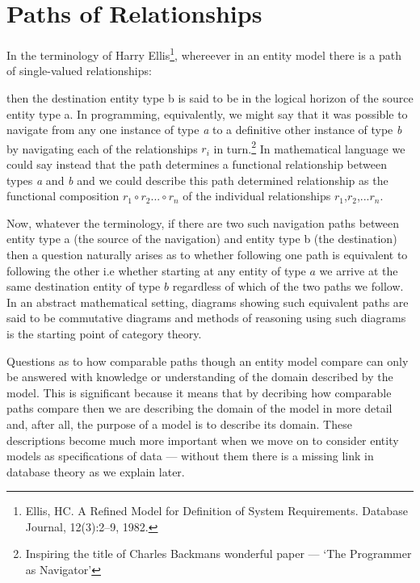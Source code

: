 


\section{Paths of Relationships}
\label{PathsofRelationships}

\mynote
In the terminology of Harry Ellis\footnote{Ellis, HC. A Refined Model for Definition of System Requirements. Database Journal, 12(3):2--9, 1982.}, whereever in an entity model there is a path of single-valued relationships:
\begin{center}

\end{center}
then the destination entity type b is said to be in the logical horizon of the source entity type a. 
In programming, equivalently, we might say that it was possible to navigate from any one instance of type \textit{a} to a definitive other instance of type \textit{b} by navigating each of the relationships $r_i$ in turn.\footnote{Inspiring the title of Charles Backmans wonderful paper --- `The Programmer as Navigator'}
 In mathematical language we could say instead that the path determines a functional relationship between types
\textit{a} and \textit{b} and we could describe this path determined relationship as the functional composition $r_1 \circ r_2 ... \circ r_n$ of the individual relationships $r_1$,$r_2$,...$r_n$.

\mynote
Now, whatever the terminology, if there are two such navigation paths between entity type a (the source
of the navigation) and entity type b (the destination) then a question naturally arises as to whether following one path is equivalent to following the other i.e whether starting at any entity of type $a$ we arrive at the same destination entity of type $b$ regardless of which of the two paths we follow. In an abstract mathematical setting, diagrams showing such equivalent paths are said to be commutative diagrams and methods of reasoning using such diagrams is the starting point of category theory.

\mynote
Questions as to how comparable paths though an entity model compare can only be answered with knowledge or understanding of the domain described by the model. This is significant because it means that by decribing how comparable paths compare then we are describing the domain of the model in more detail and, after all, the purpose of a model is to describe its domain. 
These descriptions become much more important when we move on to consider entity models as specifications of data --- without them there is a missing link in database theory as we explain later. 

